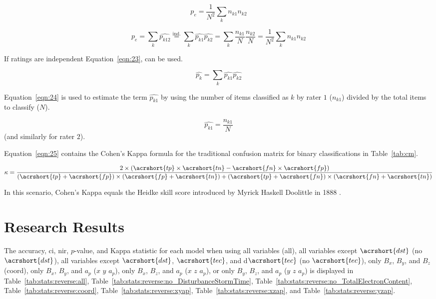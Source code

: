 \documentclass[sn-mathphys-num]{sn-jnl}%
\begin{document}
\begin{equation}
	p_{e}={\frac {1}{N^{2}}}\sum_{k}n_{k1}n_{k2}
	\label{eqn:21}
\end{equation}

\begin{equation}
	p_{e}=\sum_{k}{\widehat {p_{k12}}}{\overset{\text{ind.}}{=}}\sum_{k}{\widehat {p_{k1}}}{\widehat {p_{k2}}}=\sum_{k}{\frac {n_{k1}}{N}}{\frac {n_{k2}}{N}}={\frac {1}{N^{2}}}\sum_{k}n_{k1}n_{k2}
	\label{eqn:22}
\end{equation}

If ratings are independent Equation~\ref{eqn:23}, can be used.

\begin{equation}
	\textstyle{\widehat{p_{k}}}=\sum_{k}{\widehat{p_{k1}}}{\widehat {p_{k2}}}
	\label{eqn:23}
\end{equation}

Equation~\ref{eqn:24} is used to estimate the term $\widehat{p_{k1}}$ by using the number of items classified as $k$ by rater $1$ ($n_{k1}$) divided by the total items to classify ($N$).

\begin{equation}
	\widehat {p_{k1}}=\frac{n_{k1}}{N}
	\label{eqn:24}
\end{equation}
 (and similarly for rater $2$).
 
Equation~\ref{eqn:25} contains the Cohen's Kappa formula \cite{chicco2021matthews} for the traditional confusion matrix for binary classifications in Table~\ref{tab:cm}.

\begin{equation}
	\kappa ={\frac{2\times (\acrshort{tp}\times \acrshort{tn}-\acrshort{fn}\times \acrshort{fp})}{(\acrshort{tp}+\acrshort{fp})\times (\acrshort{fp}+\acrshort{tn})+(\acrshort{tp}+\acrshort{fn})\times (\acrshort{fn}+\acrshort{tn})}}
	\label{eqn:25}
\end{equation}

In this scenario, Cohen's Kappa equals the Heidke skill score introduced by Myrick Haskell Doolittle in 1888 \cite{heidke1926berechnung, philosophical1887bulletin}.

\section{Research Results}
\label{sec:Results}

The accuracy, \acrshort{ci}, \acrshort{nir}, $p$-value, and Kappa statistic for each model when using all variables (all), all variables except $\acrshort{dst}$ (no $\acrshort{dst}$), all variables except $\acrshort{dst}$, $\acrshort{tec}$, and d$\acrshort{tec}$ (no $\acrshort{tec}$), only $B_{x}$, $B_{y}$, and $B_{z}$ (coord), only $B_{x}$, $B_{y}$, and $a_{p}$ ($x$ $y$ $a_{p}$), only $B_{x}$, $B_{z}$, and $a_{p}$ ($x$ $z$ $a_{p}$), or only $B_{y}$, $B_{z}$, and $a_{p}$ ($y$ $z$ $a_{p}$) is displayed in Table~\ref{tab:stats:reverse:all}, Table~\ref{tab:stats:reverse:no_DisturbanceStormTime}, Table~\ref{tab:stats:reverse:no_TotalElectronContent}, Table~\ref{tab:stats:reverse:coord}, Table~\ref{tab:stats:reverse:xyap}, Table~\ref{tab:stats:reverse:xzap}, and Table~\ref{tab:stats:reverse:yzap}.
\end{document}
